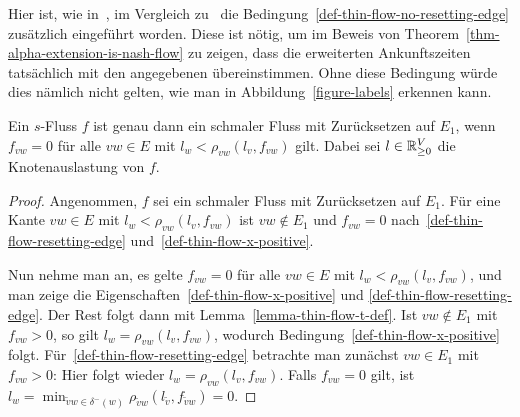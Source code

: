 \begin{remark}\label{remark-thin-flow}
	Hier ist, wie in~\cite[Definition~4]{Cominetti2011}, im Vergleich zu~\cite[Definition~6]{Koch2011} die Bedingung~\ref{def-thin-flow-no-resetting-edge} zusätzlich eingeführt worden.
	Diese ist nötig, um im Beweis von Theorem~\ref{thm-alpha-extension-is-nash-flow} zu zeigen, dass die erweiterten Ankunftszeiten tatsächlich mit den angegebenen übereinstimmen.
	Ohne diese Bedingung würde dies nämlich nicht gelten, wie man in Abbildung~\ref{figure-labels} erkennen kann.
\end{remark}

\begin{lemma}\label{lemma-equivalent-thin-flow}
	Ein $s$-Fluss $f$ ist genau dann ein schmaler Fluss mit Zurück\-setzen auf $E_1$, wenn $f_{vw}= 0$ für alle $vw\in E$ mit $l_w < \rho_{vw}(l_v, f_{vw})$ gilt.
	Dabei sei $l\in\mathbb{R}_{\geq 0}^V$ die Knotenauslastung von $f$.
\end{lemma}
\begin{proof}
	Angenommen, $f$ sei ein schmaler Fluss mit Zurücksetzen auf $E_1$.
	Für eine Kante $vw\in E$ mit $l_w < \rho_{vw}(l_v, f_{vw})$ ist $vw\notin E_1$ und $f_{vw}=0$ nach~\ref{def-thin-flow-resetting-edge} und~\ref{def-thin-flow-x-positive}.

	Nun nehme man an, es gelte $f_{vw}=0$ für alle $vw\in E$ mit $l_w < \rho_{vw}(l_v, f_{vw})$, und man zeige die Eigenschaften~\ref{def-thin-flow-x-positive} und \ref{def-thin-flow-resetting-edge}.
	Der Rest folgt dann mit Lemma~\ref{lemma-thin-flow-t-def}.
	Ist $vw\notin E_1$ mit $f_{vw}>0$, so gilt $l_w = \rho_{vw}(l_v, f_{vw})$, wodurch Bedingung~\ref{def-thin-flow-x-positive} folgt.
	Für~\ref{def-thin-flow-resetting-edge} betrachte man zunächst $vw\in E_1$ mit $f_{vw}>0$: Hier folgt wieder $l_w = \rho_{vw}(l_v, f_{vw})$.
	Falls $f_{vw}=0$ gilt, ist $l_w=\min_{\tilde{v}w\in \delta^-(w)} \rho_{\tilde{v}w}(l_{\tilde{v}}, f_{\tilde{v}w}) = 0$.
\end{proof}

